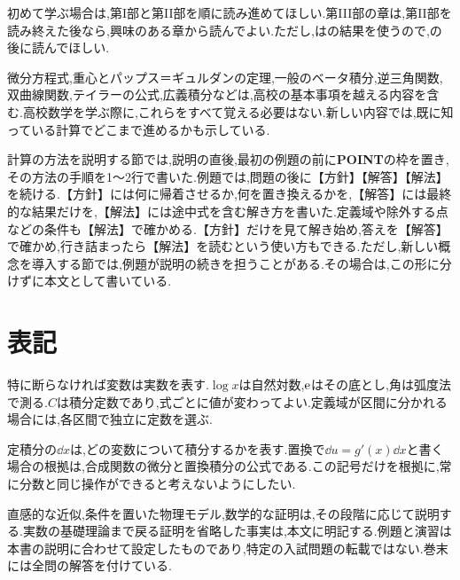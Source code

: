 初めて学ぶ場合は,第I部と第II部を順に読み進めてほしい.第III部の章は,第II部を読み終えた後なら,興味のある章から読んでよい.ただし,はの結果を使うので,の後に読んでほしい.

微分方程式,重心とパップス＝ギュルダンの定理,一般のベータ積分,逆三角関数,双曲線関数,テイラーの公式,広義積分などは,高校の基本事項を越える内容を含む.高校数学を学ぶ際に,これらをすべて覚える必要はない.新しい内容では,既に知っている計算でどこまで進めるかも示している.

計算の方法を説明する節では,説明の直後,最初の例題の前に\textbf{POINT}の枠を置き,その方法の手順を1〜2行で書いた.例題では,問題の後に【方針】【解答】【解法】を続ける.【方針】には何に帰着させるか,何を置き換えるかを,【解答】には最終的な結果だけを,【解法】には途中式を含む解き方を書いた.定義域や除外する点などの条件も【解法】で確かめる.【方針】だけを見て解き始め,答えを【解答】で確かめ,行き詰まったら【解法】を読むという使い方もできる.ただし,新しい概念を導入する節では,例題が説明の続きを担うことがある.その場合は,この形に分けずに本文として書いている.

\section*{表記}
特に断らなければ変数は実数を表す.$\log x$は自然対数,$\mathrm{e}$はその底とし,角は弧度法で測る.$C$は積分定数であり,式ごとに値が変わってよい.定義域が区間に分かれる場合には,各区間で独立に定数を選ぶ.

定積分の$\dd x$は,どの変数について積分するかを表す.置換で$\dd u=g'(x)\dd x$と書く場合の根拠は,合成関数の微分と置換積分の公式である.この記号だけを根拠に,常に分数と同じ操作ができると考えないようにしたい.

直感的な近似,条件を置いた物理モデル,数学的な証明は,その段階に応じて説明する.実数の基礎理論まで戻る証明を省略した事実は,本文に明記する.例題と演習は本書の説明に合わせて設定したものであり,特定の入試問題の転載ではない.巻末には全問の解答を付けている.
